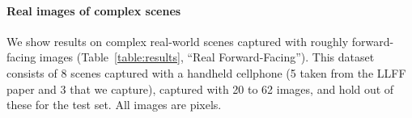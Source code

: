 \documentclass[runningheads]{llncs}
\begin{document}
\paragraph{\textbf{Real images of complex scenes}}

We show results on complex real-world scenes captured with roughly forward-facing images (Table~\ref{table:results}, ``Real Forward-Facing''). This dataset consists of 8 scenes captured with a handheld cellphone (5 taken from the LLFF paper and 3 that we capture), captured with 20 to 62 images, and hold out  of these for the test set. All images are  pixels.




\renewcommand{\resultsfigwidth}{1.27in}
\renewcommand{\resultscropwidth}{0.84in}


\newcommand{\cropfern}[1]{
  \makecell{
\texttt{[image: \#1]} \\
  \texttt{[image: \#1]} 
  }
}

\newcommand{\croporchid}[1]{
  \makecell{
\texttt{[image: \#1]} \\
  \texttt{[image: \#1]} 
  }
}



\newcommand{\cropredtrex}[1]{
  \makecell{
\texttt{[image: \#1]}   \\
  \texttt{[image: \#1]} 
  }
}
\end{document}
